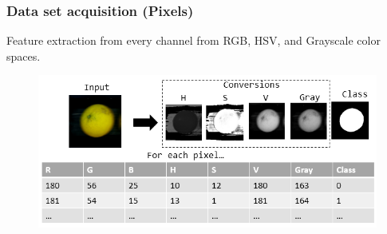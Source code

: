 \documentclass[
serif,
compress,
xcolor=table,
dvipsnames,
]{beamer}
\begin{document}
\begin{frame}
\frametitle{Data set acquisition (Pixels)}

Feature extraction from every channel from RGB, HSV, and Grayscale color spaces.


\begin{figure}[h]
        \centering
        \includegraphics[width=\linewidth]{ftEx}  
        \label{ftex}
    \end{figure}

\end{frame}
\end{document}
